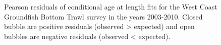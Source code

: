\documentclass[
]{scrartcl}
\begin{document}
\begin{figure}[H]


\caption{\label{fig-peasrson-resids-age-wcgbts1}Pearson residuals of
conditional age at length fits for the West Coast Groundfish Bottom
Trawl survey in the years 2003-2010. Closed bubble are positive
residuals (observed \textgreater{} expected) and open bubbles are
negative residuals (observed \textless{} expected).}

\end{figure}%
\end{document}
